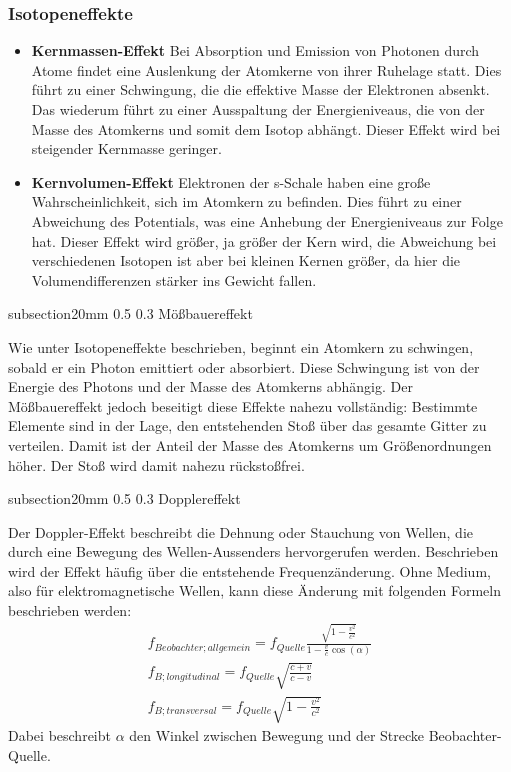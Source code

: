 \documentclass[german, %
parskip=full, %
bibliography=totoc, %
]{scrartcl}
\makeatletter
\renewcommand\subsection{\@startsection 
   {subsection}{2}{0mm}%
   {0.5\baselineskip}%
   {0.3\baselineskip}%
   {\bfseries\sffamily\large}%
   }
\makeatother
\begin{document}
\subsubsection{Isotopeneffekte}

\begin{itemize}
\item \textbf{Kernmassen-Effekt} Bei Absorption und Emission von Photonen durch Atome findet eine Auslenkung der Atomkerne von ihrer Ruhelage statt. Dies führt zu einer Schwingung, die die effektive Masse der Elektronen absenkt. Das wiederum führt zu einer Ausspaltung der Energieniveaus, die von der Masse des Atomkerns und somit dem Isotop abhängt. Dieser Effekt wird bei steigender Kernmasse geringer.
\item \textbf{Kernvolumen-Effekt} Elektronen der s-Schale haben eine große Wahrscheinlichkeit, sich im Atomkern zu befinden. Dies führt zu einer Abweichung des Potentials, was eine Anhebung der Energieniveaus zur Folge hat. Dieser Effekt wird größer, ja größer der Kern wird, die Abweichung bei verschiedenen Isotopen ist aber bei kleinen Kernen größer, da hier die Volumendifferenzen stärker ins Gewicht fallen.
\end{itemize}

\subsection{Mößbauereffekt}

Wie unter Isotopeneffekte beschrieben, beginnt ein Atomkern zu schwingen, sobald er ein Photon emittiert oder absorbiert. Diese Schwingung ist von der Energie des Photons und der Masse des Atomkerns abhängig. Der Mößbauereffekt jedoch beseitigt diese Effekte nahezu vollständig: Bestimmte Elemente sind in der Lage, den entstehenden Stoß über das gesamte Gitter zu verteilen. Damit ist der Anteil der Masse des Atomkerns um Größenordnungen höher. Der Stoß wird damit nahezu rückstoßfrei.

\subsection{Dopplereffekt}

Der Doppler-Effekt beschreibt die Dehnung oder Stauchung von Wellen, die durch eine Bewegung des Wellen-Aussenders hervorgerufen werden. Beschrieben wird der Effekt häufig über die entstehende Frequenzänderung. Ohne Medium, also für elektromagnetische Wellen, kann diese Änderung mit folgenden Formeln beschrieben werden:
\begin{align}
f_{Beobachter;allgemein} = f_{Quelle} \frac{\sqrt{1 - \frac{v^2}{c^2}}}{1 - \frac{v}{c} \cos (\alpha)} \\
f_{B; longitudinal} = f_{Quelle} \sqrt{\frac{c + v}{c - v}} \\
f_{B; transversal} = f_{Quelle} \sqrt{1 - \frac{v^2}{c^2}} \label{for:doppler}
\end{align}
Dabei beschreibt $\alpha$ den Winkel zwischen Bewegung und der Strecke Beobachter-Quelle.
\end{document}
